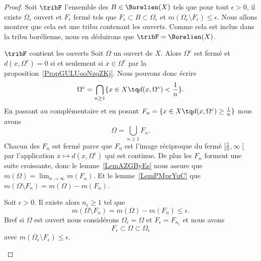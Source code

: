 \begin{proof}
    Soit \( \tribF\) l'ensemble des \( B\in\Borelien(X)\) tels que pour tout \( \epsilon>0\), il existe \( \Omega_{\epsilon}\) ouvert et \( F_{\epsilon}\) fermé tels que \( F_{\epsilon}\subset B\subset \Omega_{\epsilon}\) et \( m(\Omega_{\epsilon}\setminus F_{\epsilon})\leq \epsilon\). Nous allons montrer que cela est une tribu contenant les ouverts. Comme cela est inclus dans la tribu borélienne, nous en déduirons que \( \tribF=\Borelien(X)\).
    \begin{subproof}
        \item[\( \tribF\) contient les ouverts]
            Soit \( \Omega\) un ouvert de \( X\). Alors \( \Omega^c\) est fermé et \( d(x,\Omega^c)=0\) si et seulement si \( x\in \Omega^c\) par la proposition~\ref{PropGULUooNzqZKj}. Nous pouvons donc écrire
            \begin{equation}
                 \Omega^c=\bigcap_{n\geq 1}\{ x\in X\tq d(x,\Omega^c)<\frac{1}{ n } \}.
            \end{equation}
            En passant au complémentaire et en posant \( F_n=\{ x\in X\tq d(x,\Omega^c)\geq \frac{1}{ n } \}\) nous avons
            \begin{equation}
                \Omega=\bigcup_{n\geq 1}F_n.
            \end{equation}
            Chacun des \( F_n\) est fermé parce que \( F_n\) est l'image réciproque du fermé \( \mathopen[ \frac{1}{ n } , \infty \mathclose[\) par l'application \( x\mapsto d(x,\Omega^c)\) qui est continue. De plus les \( F_n\) forment une suite croissante, donc le lemme~\ref{LemAZGByEs} nous assure que \( m(\Omega)=\lim_{n\to \infty}m(F_n)\). Et le lemme~\ref{LemPMprYuC} que \( m(\Omega\setminus F_n)=m(\Omega)-m(F_n)\).

                Soit \( \epsilon>0\). Il existe alors \( n_{\epsilon}\geq 1\) tel que
                \begin{equation}
                    m(\Omega\setminus F_n)=m(\Omega)-m(F_n)\leq \epsilon.
                \end{equation}
                Bref si \( \Omega\) est ouvert nous considérons \( \Omega_{\epsilon}=\Omega\) et \( F_{\epsilon}=F_{n_{\epsilon}}\) et nous avons
                \begin{equation}
                    F_{\epsilon}\subset \Omega\subset \Omega_{\epsilon}
                \end{equation}
                avec \( m(\Omega_{\epsilon}\setminus F_{\epsilon})\leq \epsilon\).


\end{subproof}
\end{proof}
